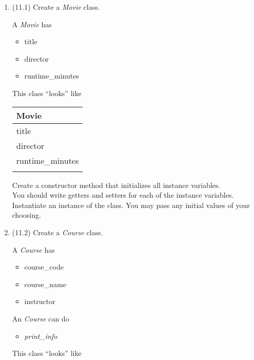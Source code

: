 \documentclass{article}
\begin{document}
\begin{enumerate}
\item (11.1) Create a \textit{Movie} class.\\
	\begin{minipage}{.6\textwidth}		
		A \textit{Movie} has
		\begin{itemize}
			\item title 
			\item director
			\item runtime\_minutes	
		\end{itemize}
	\end{minipage}
	\begin{minipage}{.4\textwidth}
		This class ``looks'' like 
				
		\vspace*{1em}
		\begin{tabular}{|l|}
			\hline Movie\\ \hline
			title\\ director\\ runtime\_minutes\\ \hline
			\\  \hline
		\end{tabular}
	\end{minipage}

	\vspace*{2ex}
	Create a constructor method that initializes all instance variables.\\
	You should write getters and setters for each of the instance variables.\\
	Instantiate an instance of the class. You may pass any initial values of your choosing.


\item (11.2) Create a \textit{Course} class.\\
	\begin{minipage}{.6\textwidth}
		A \textit{Course} has
		\begin{itemize}
			\item course\_code 
			\item course\_name
			\item instructor	
		\end{itemize}

		An \textit{Course} can do
		\begin{itemize}
			\item \textit{print\_info}
		\end{itemize}	
	\end{minipage}
	\begin{minipage}{.4\textwidth}
		This class ``looks'' like 
				

\end{minipage}
\end{enumerate}
\end{document}
